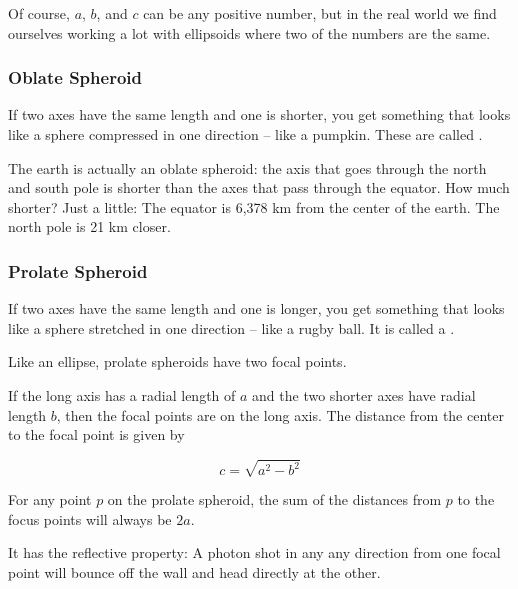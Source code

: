 Of course, $a$, $b$, and $c$ can be any positive number, but in the
real world we find ourselves working a lot with ellipsoids where two
of the numbers are the same.

\subsubsection{Oblate Spheroid}

If two axes have the same length and one is shorter, you get something
that looks like a sphere compressed in one direction -- like a
pumpkin.  These are called .

The earth is actually an oblate spheroid: the axis that goes through
the north and south pole is shorter than the axes that pass through
the equator.  How much shorter? Just a little: The equator is 6,378 km
from the center of the earth. The north pole is 21 km closer.

\subsubsection{Prolate Spheroid}

If two axes have the same length and one is longer, you get something
that looks like a sphere stretched in one direction -- like a rugby
ball. It is called a .

Like an ellipse, prolate spheroids have two focal points.

\begin{mdframed}[style=important, frametitle={Focal Points of a Prolate Spheroid}]

  If the long axis has a radial length of $a$ and the two shorter axes
  have radial length $b$, then the focal points are on the long axis.  The distance from the center to the focal point is given by

  $$c = \sqrt{a^2 - b^2}$$

  For any point $p$ on the prolate spheroid, the sum of the distances
  from $p$ to the focus points will always be $2a$.

  It has the reflective property: A photon shot in any any direction
  from one focal point will bounce off the wall and head directly at the other.
  
\end{mdframed}

